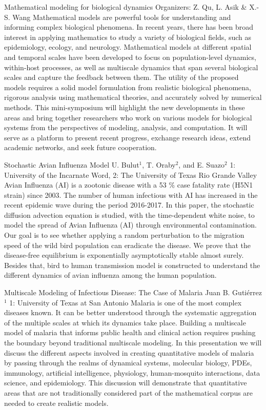 \label{mini03}

\miniabs
{Mathematical modeling for biological dynamics}
{Organizers: Z. Qu,	L. Asik \& X.-S. Wang}
{Mathematical models are powerful tools for understanding and informing complex biological phenomena. In recent years, there has been broad interest in applying mathematics to study a variety of biological fields, such as epidemiology, ecology, and neurology. Mathematical models at different spatial and temporal scales have been developed to focus on population-level dynamics, within-host processes, as well as multiscale dynamics that span several biological scales and capture the feedback between them. The utility of the proposed models requires a solid model formulation from realistic biological phenomena, rigorous analysis using mathematical theories, and accurately solved by numerical methods. This mini-symposium will highlight the new developments in these areas and bring together researchers who work on various models for biological systems from the perspectives of modeling, analysis, and computation. It will serve as a platform to present recent progress, exchange research ideas, extend academic networks, and seek future cooperation.}

\vspace{2ex}
\abs
{Stochastic Avian Influenza Model}
{U. Bulut$^{1}$, T. Oraby$^{2}$, and E. Suazo$^{2}$}
{1: University of the Incarnate Word, 2: The University of Texas Rio Grande Valley}
{Avian Influenza (AI) is a zootonic disease with a 53 \% case fatality rate (H5N1 strain) since 2003. The number of human infectious with AI has increased in the recent epidemic wave during the period 2016-2017.  In this paper, the stochastic diffusion advection equation is studied, with the time-dependent white noise, to model the spread of Avian Influenza (AI) through environmental contamination. Our goal is to see whether applying a random perturbation to the migration speed of the wild bird population can eradicate the disease. We prove that the disease-free equilibrium is exponentially asymptotically stable almost surely. Besides that, bird to human transmission model is constructed to understand the different dynamics  of avian influenza among the human population.}


\vspace{1.5ex}
\abs
{Multiscale Modeling of Infectious Disease: The Case of Malaria}
{Juan B. Guti\'errez$^{1}$}
{1: University of Texas at San Antonio}
{Malaria is one of the most complex diseases known. It can be better understood through the systematic aggregation of the multiple scales at which its dynamics take place. Building a multiscale model of malaria that informs public health and clinical action requires pushing the boundary beyond traditional multiscale modeling. In this presentation we will discuss the different aspects involved in creating quantitative models of malaria by passing through the realms of dynamical systems, molecular biology, PDEs, immunology, artificial intelligence, physiology, human-mosquito interactions, data science, and epidemiology. This discussion will demonstrate that quantitative areas that are not traditionally considered part of the mathematical corpus are needed to create realistic models.}


